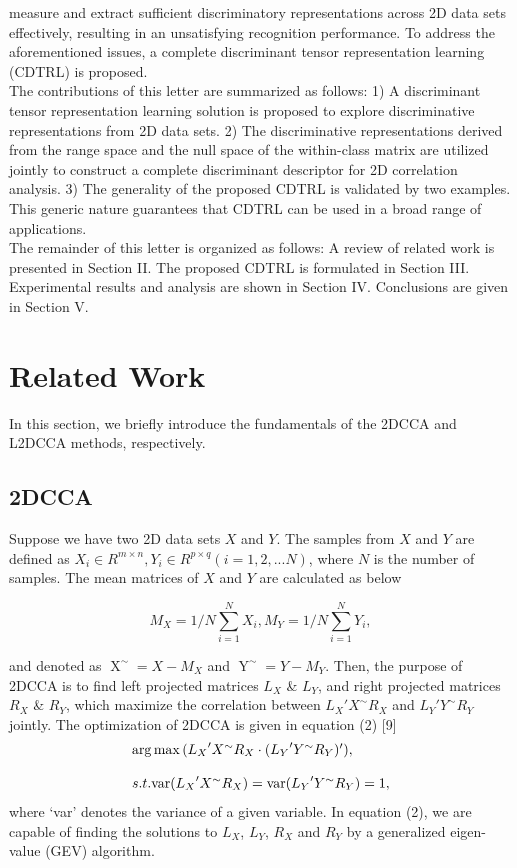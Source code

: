 \documentclass[journal]{IEEEtran}
\begin{document}
measure and extract sufficient discriminatory representations across 2D data sets effectively, resulting in an unsatisfying recognition performance. To address the aforementioned issues, a complete discriminant tensor representation learning (CDTRL) is proposed.\\\indent The contributions of this letter are summarized as follows: 1) A discriminant tensor representation learning solution is proposed to explore discriminative representations from 2D data sets. 2) The discriminative representations derived from the range space and the null space of the within-class matrix are utilized jointly to construct a complete discriminant descriptor for 2D correlation analysis. 3) The generality of the proposed CDTRL is validated by two examples. This generic nature guarantees that CDTRL can be used in a broad range of applications.\\\indent The remainder of this letter is organized as follows: A review of related work is presented in Section II. The proposed CDTRL is formulated in Section III. Experimental results and analysis are shown in Section IV. Conclusions are given in Section V.
\section{Related Work}
In this section, we briefly introduce the fundamentals of the 2DCCA and L2DCCA methods, respectively.
\subsection{2DCCA}
Suppose we have two 2D data sets $X$ and $Y$. The samples from $X$ and $Y$ are defined as $ {X_i} \in {R^{m \times n}},{Y_i} \in {R^{p \times q}} (i=1,2,...N)$, where $N$ is the number of samples. The mean matrices of $X$ and $Y$ are calculated as below
\begin{small}
\begin{equation}
{M_X} = 1/N\sum\limits_{i = 1}^N {{X_i}},
{M_Y} = 1/N\sum\limits_{i = 1}^N {{Y_i}},
\end{equation}
\end{small}
and denoted as $\mathop X^{\sim} = X - {M_X} $ and $\mathop Y^{\sim} = Y - {M_Y} $. Then, the purpose of 2DCCA is to find left projected matrices ${L_X}$ \& ${L_Y}$, and right projected matrices ${R_X}$ \& ${R_Y}$, which maximize the correlation between ${L_X}'X^{\sim}R_X$ and ${L_Y}'Y^{\sim}R_Y$ jointly. The optimization of 2DCCA is given in equation (2) [9]
\begin{equation}
\begin{array}{l}
 \arg \max {\mathop{\rm}} ({L_X}^\prime {X^{\sim}}{R_X} \cdot ({L_Y}^\prime {Y^{\sim}}{R_Y})^\prime), \\
 \\
 s.t.{\mathop{\rm var}} ({L_X}^\prime {X^{\sim}}{R_X}) = {\mathop{\rm var}} ({L_Y}^\prime {Y^{\sim}}{R_Y}) = 1, \\
 \end{array}
\end{equation}
where `var' denotes the variance of a given variable. In equation (2), we are capable of finding the solutions to ${L_X}$, ${L_Y}$, ${R_X}$ and ${R_Y}$ by a generalized eigen-value (GEV) algorithm.
\end{document}

